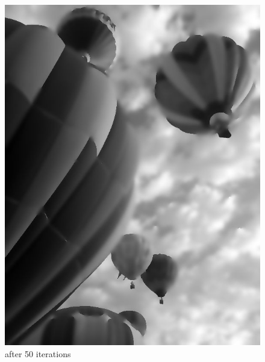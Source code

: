 \begin{figure}[ht]
\begin{minipage}[b]{0.45\linewidth}
\includegraphics[width=\textwidth]{baloons_resized_bw_50.jpg}
\caption*{after 50 iterations}
\end{minipage}
\end{figure}

